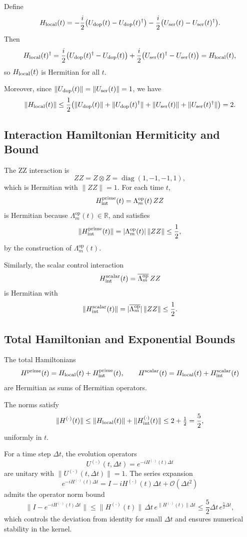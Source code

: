 \documentclass[11pt]{article}
\begin{document}
Define
\[
  H_{\rm local}(t)
  = -\frac{i}{2}\bigl(U_{\rm dop}(t) - U_{\rm dop}(t)^\dagger\bigr)
    -\frac{i}{2}\bigl(U_{\rm ser}(t) - U_{\rm ser}(t)^\dagger\bigr).
\]
Then
\[
  H_{\rm local}(t)^\dagger
  = \frac{i}{2}\bigl(U_{\rm dop}(t)^\dagger - U_{\rm dop}(t)\bigr)
    + \frac{i}{2}\bigl(U_{\rm ser}(t)^\dagger - U_{\rm ser}(t)\bigr)
  = H_{\rm local}(t),
\]
so \(H_{\rm local}(t)\) is Hermitian for all \(t\).

Moreover, since \(\|U_{\rm dop}(t)\| = \|U_{\rm ser}(t)\| = 1\), we have
\[
  \|H_{\rm local}(t)\|
  \le \frac12\bigl(\|U_{\rm dop}(t)\| + \|U_{\rm dop}(t)^\dagger\|
                 + \|U_{\rm ser}(t)\| + \|U_{\rm ser}(t)^\dagger\|\bigr)
  = 2.
\]

\subsection{Interaction Hamiltonian Hermiticity and Bound}

The ZZ interaction is
\[
  ZZ = Z\otimes Z = \operatorname{diag}(1,-1,-1,1),
\]
which is Hermitian with \(\|ZZ\| = 1\). For each time \(t\),
\[
  H_{\rm int}^{\rm prime}(t)
  = \Lambda_m^{\mathrm{op}}(t)\,ZZ
\]
is Hermitian because \(\Lambda_m^{\mathrm{op}}(t)\in\mathbb{R}\), and satisfies
\[
  \|H_{\rm int}^{\rm prime}(t)\|
  = |\Lambda_m^{\mathrm{op}}(t)|\,\|ZZ\|
  \le \frac12,
\]
by the construction of \(\Lambda_m^{\mathrm{op}}(t)\).

Similarly, the scalar control interaction
\[
  H_{\rm int}^{\rm scalar}(t)
  = \overline{\Lambda_m^{\mathrm{op}}}\, ZZ
\]
is Hermitian with
\[
  \|H_{\rm int}^{\rm scalar}(t)\|
  = |\overline{\Lambda_m^{\mathrm{op}}}|\,\|ZZ\|
  \le \frac12.
\]

\subsection{Total Hamiltonian and Exponential Bounds}

The total Hamiltonians
\[
  H^{\rm prime}(t) = H_{\rm local}(t) + H_{\rm int}^{\rm prime}(t), \qquad
  H^{\rm scalar}(t) = H_{\rm local}(t) + H_{\rm int}^{\rm scalar}(t)
\]
are Hermitian as sums of Hermitian operators.

The norms satisfy
\[
  \|H^{(\cdot)}(t)\|
  \le \|H_{\rm local}(t)\| + \|H_{\rm int}^{(\cdot)}(t)\|
  \le 2 + \tfrac12 = \frac{5}{2},
\]
uniformly in \(t\).

For a time step \(\Delta t\), the evolution operators
\[
  U^{(\cdot)}(t,\Delta t)
  = e^{-i H^{(\cdot)}(t)\Delta t}
\]
are unitary with \(\|U^{(\cdot)}(t,\Delta t)\|=1\). The series expansion
\[
  e^{-iH^{(\cdot)}(t)\Delta t}
  = I - i H^{(\cdot)}(t)\Delta t + \mathcal{O}(\Delta t^2)
\]
admits the operator norm bound
\[
  \|I - e^{-iH^{(\cdot)}(t)\Delta t}\|
  \le \|H^{(\cdot)}(t)\|\,\Delta t\, e^{\|H^{(\cdot)}(t)\|\Delta t}
  \le \frac{5}{2}\Delta t\, e^{\frac{5}{2}\Delta t},
\]
which controls the deviation from identity for small \(\Delta t\) and ensures numerical stability in the kernel.
\end{document}
